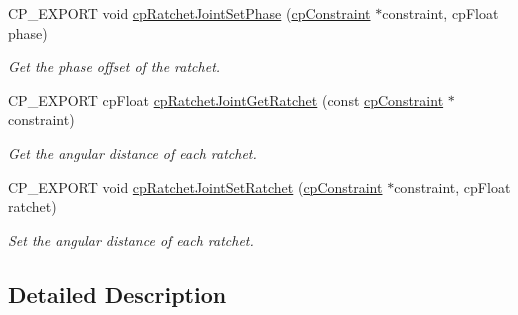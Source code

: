 \begin{DoxyCompactItemize}
C\+P\+\_\+\+E\+X\+P\+O\+RT void \hyperlink{group__cpRatchetJoint_ga19d03c89211a4fb3497e1858fa4cc710}{cp\+Ratchet\+Joint\+Set\+Phase} (\hyperlink{structcpConstraint}{cp\+Constraint} $\ast$constraint, cp\+Float phase)
\begin{DoxyCompactList}\small\item\em Get the phase offset of the ratchet. \end{DoxyCompactList}\item 
\mbox{\label{group__cpRatchetJoint_ga1b085cf204fe62ce3f75fef90dec7152}} 
C\+P\+\_\+\+E\+X\+P\+O\+RT cp\+Float \hyperlink{group__cpRatchetJoint_ga1b085cf204fe62ce3f75fef90dec7152}{cp\+Ratchet\+Joint\+Get\+Ratchet} (const \hyperlink{structcpConstraint}{cp\+Constraint} $\ast$constraint)
\begin{DoxyCompactList}\small\item\em Get the angular distance of each ratchet. \end{DoxyCompactList}\item 
\mbox{\label{group__cpRatchetJoint_ga42f49bb4793fd51c9673cfa11bdb4a33}} 
C\+P\+\_\+\+E\+X\+P\+O\+RT void \hyperlink{group__cpRatchetJoint_ga42f49bb4793fd51c9673cfa11bdb4a33}{cp\+Ratchet\+Joint\+Set\+Ratchet} (\hyperlink{structcpConstraint}{cp\+Constraint} $\ast$constraint, cp\+Float ratchet)
\begin{DoxyCompactList}\small\item\em Set the angular distance of each ratchet. \end{DoxyCompactList}\end{DoxyCompactItemize}


\subsection{Detailed Description}
